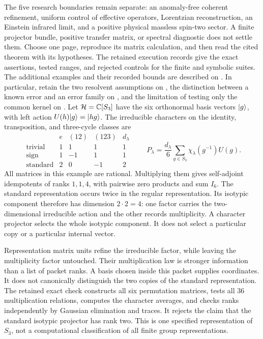 The five research boundaries remain separate: an anomaly-free coherent refinement, uniform control of effective operators, Lorentzian reconstruction, an Einstein infrared limit, and a positive physical massless spin-two sector. A finite projector bundle, positive transfer matrix, or spectral diagnostic does not settle them.
Choose one page, reproduce its matrix calculation, and then read the cited theorem with its hypotheses. The retained execution records give the exact assertions, tested ranges, and rejected controls for the finite and symbolic suites. The additional examples and their recorded bounds are described on . In particular, retain the two resolvent assumptions on , the distinction between a known error and an error family on , and the limitation of testing only the common kernel on .
Let $\HH=\CC[S_3]$ have the six orthonormal basis vectors $\lvert g\rangle$, with left action $U(h)\lvert g\rangle=\lvert hg\rangle$. The irreducible characters on the identity, transposition, and three-cycle classes are
\[
\begin{array}{c|rrr|r}
 & e & (12)&(123)&d_\lambda\\\hline
\text{trivial}&1&1&1&1\\
\text{sign}&1&-1&1&1\\
\text{standard}&2&0&-1&2
\end{array}
\qquad
P_\lambda=\frac{d_\lambda}{6}\sum_{g\in S_3}\chi_\lambda(g^{-1})U(g).
\]
All matrices in this example are rational. Multiplying them gives self-adjoint idempotents of ranks $1,1,4$, with pairwise zero products and sum $I_6$.
The standard representation occurs twice in the regular representation. Its isotypic component therefore has dimension $2\cdot2=4$: one factor carries the two-dimensional irreducible action and the other records multiplicity. A character projector selects the whole isotypic component. It does not select a particular copy or a particular internal vector.

Representation matrix units refine the irreducible factor, while leaving the multiplicity factor untouched. Their multiplication law is stronger information than a list of packet ranks. A basis chosen inside this packet supplies coordinates. It does not canonically distinguish the two copies of the standard representation.
The retained exact check constructs all six permutation matrices, tests all $36$ multiplication relations, computes the character averages, and checks ranks independently by Gaussian elimination and traces. It rejects the claim that the standard isotypic projector has rank two. This is one specified representation of $S_3$, not a computational classification of all finite group representations.

